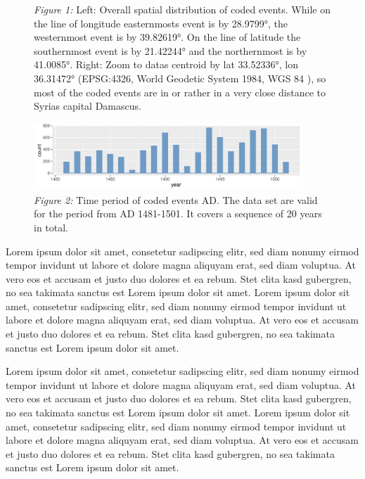\begin{figure}[H]
\begin{center}
\begin{minipage}[t]{0.4\textwidth}
\end{minipage}
\caption*{\textit{Figure 1:} Left: Overall spatial distribution of coded events. While on the line of longitude easternmosts event is by 28.9799°, the westernmost event is by 39.82619°. On the line of latitude the southernmost event is by 21.42244° and the northernmost is by 41.0085°. Right: Zoom to datas centroid by lat 33.52336°, lon 36.31472° (EPSG:4326, World Geodetic System 1984, WGS 84 ), so most of the coded events are in or rather in a very close distance to Syrias capital Damascus.}
\end{center}
\end{figure}
\begin{figure}[H]
	\begin{center}
 \includegraphics[width=0.9\textwidth]{fig/materialspecification/example_year_hist.pdf}
 \caption*{\textit{Figure 2:} Time period of coded events AD. The data set are valid for the period from AD 1481-1501. It covers a sequence of 20 years in total.
}
 \end{center}
\end{figure}
Lorem ipsum dolor sit amet, consetetur sadipscing elitr, sed diam nonumy eirmod tempor invidunt ut labore et dolore magna aliquyam erat, sed diam voluptua. At vero eos et accusam et justo duo dolores et ea rebum. Stet clita kasd gubergren, no sea takimata sanctus est Lorem ipsum dolor sit amet. Lorem ipsum dolor sit amet, consetetur sadipscing elitr, sed diam nonumy eirmod tempor invidunt ut labore et dolore magna aliquyam erat, sed diam voluptua. At vero eos et accusam et justo duo dolores et ea rebum. Stet clita kasd gubergren, no sea takimata sanctus est Lorem ipsum dolor sit amet.

Lorem ipsum dolor sit amet, consetetur sadipscing elitr, sed diam nonumy eirmod tempor invidunt ut labore et dolore magna aliquyam erat, sed diam voluptua. At vero eos et accusam et justo duo dolores et ea rebum. Stet clita kasd gubergren, no sea takimata sanctus est Lorem ipsum dolor sit amet. Lorem ipsum dolor sit amet, consetetur sadipscing elitr, sed diam nonumy eirmod tempor invidunt ut labore et dolore magna aliquyam erat, sed diam voluptua. At vero eos et accusam et justo duo dolores et ea rebum. Stet clita kasd gubergren, no sea takimata sanctus est Lorem ipsum dolor sit amet.

